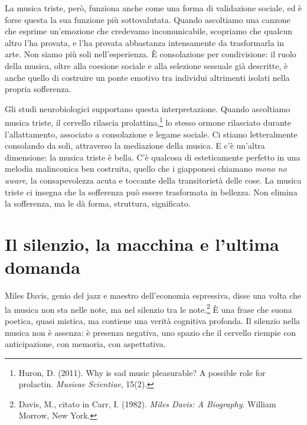 La musica triste, per\`{o}, funziona anche come una forma di validazione sociale, ed \`{e} forse questa la sua funzione pi\`{u} sottovalutata. Quando ascoltiamo una canzone che esprime un'emozione che credevamo incomunicabile, scopriamo che qualcun altro l'ha provata, e l'ha provata abbastanza intensamente da trasformarla in arte. Non siamo pi\`{u} soli nell'esperienza. \`{E} consolazione per condivisione: il ruolo della musica, oltre alla coesione sociale e alla selezione sessuale gi\`{a} descritte, \`{e} anche quello di costruire un ponte emotivo tra individui altrimenti isolati nella propria sofferenza.

Gli studi neurobiologici supportano questa interpretazione. Quando ascoltiamo musica triste, il cervello rilascia prolattina,\footnote{Huron, D. (2011). Why is sad music pleasurable? A possible role for prolactin. \textit{Musicae Scientiae}, 15(2).} lo stesso ormone rilasciato durante l'allattamento, associato a consolazione e legame sociale. Ci stiamo letteralmente consolando da soli, attraverso la mediazione della musica. E c'\`{e} un'altra dimensione: la musica triste \`{e} bella. C'\`{e} qualcosa di esteticamente perfetto in una melodia malinconica ben costruita, quello che i giapponesi chiamano \textit{mono no aware}, la consapevolezza acuta e toccante della transitoriet\`{a} delle cose. La musica triste ci insegna che la sofferenza pu\`{o} essere trasformata in bellezza. Non elimina la sofferenza, ma le d\`{a} forma, struttura, significato.

\section{Il silenzio, la macchina e l'ultima domanda}

Miles Davis, genio del jazz e maestro dell'economia espressiva, disse una volta che la musica non sta nelle note, ma nel silenzio tra le note.\footnote{Davis, M., citato in Carr, I. (1982). \textit{Miles Davis: A Biography}. William Morrow, New York.} \`{E} una frase che suona poetica, quasi mistica, ma contiene una verit\`{a} cognitiva profonda. Il silenzio nella musica non \`{e} assenza: \`{e} presenza negativa, uno spazio che il cervello riempie con anticipazione, con memoria, con aspettativa.

